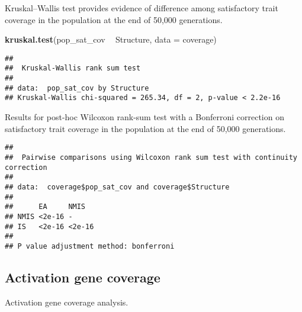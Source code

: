 \documentclass[]{book}
\newenvironment{Shaded}{\begin{snugshade}}{\end{snugshade}}
\newcommand{\DataTypeTok}[1]{\textcolor[rgb]{0.13,0.29,0.53}{#1}}
\newcommand{\KeywordTok}[1]{\textcolor[rgb]{0.13,0.29,0.53}{\textbf{#1}}}
\newcommand{\NormalTok}[1]{#1}
\newcommand{\OperatorTok}[1]{\textcolor[rgb]{0.81,0.36,0.00}{\textbf{#1}}}
\newcommand{\OtherTok}[1]{\textcolor[rgb]{0.56,0.35,0.01}{#1}}
\newcommand{\StringTok}[1]{\textcolor[rgb]{0.31,0.60,0.02}{#1}}
\begin{document}
Kruskal--Wallis test provides evidence of difference among satisfactory trait coverage in the population at the end of 50,000 generations.

\begin{Shaded}
\begin{Highlighting}[]
\KeywordTok{kruskal.test}\NormalTok{(pop_sat_cov }\OperatorTok{~}\StringTok{ }\NormalTok{Structure, }\DataTypeTok{data =}\NormalTok{ coverage)}
\end{Highlighting}
\end{Shaded}

\begin{verbatim}
## 
##  Kruskal-Wallis rank sum test
## 
## data:  pop_sat_cov by Structure
## Kruskal-Wallis chi-squared = 265.34, df = 2, p-value < 2.2e-16
\end{verbatim}

Results for post-hoc Wilcoxon rank-sum test with a Bonferroni correction on satisfactory trait coverage in the population at the end of 50,000 generations.

\begin{Shaded}
\end{Shaded}

\begin{verbatim}
## 
##  Pairwise comparisons using Wilcoxon rank sum test with continuity correction 
## 
## data:  coverage$pop_sat_cov and coverage$Structure 
## 
##      EA     NMIS  
## NMIS <2e-16 -     
## IS   <2e-16 <2e-16
## 
## P value adjustment method: bonferroni
\end{verbatim}

\hypertarget{activation-gene-coverage-2}{%
\subsection{Activation gene coverage}\label{activation-gene-coverage-2}}

Activation gene coverage analysis.
\end{document}
